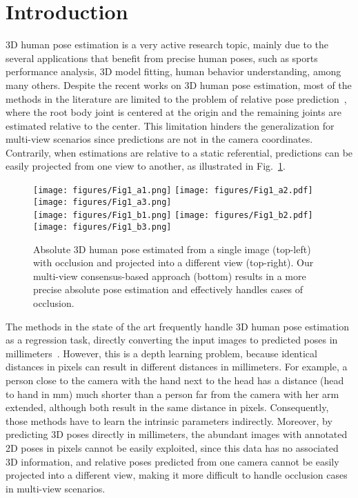 \documentclass[10pt,twocolumn,letterpaper]{article}
\newcommand{\revb}[1]{{#1}}
\begin{document}
\section{Introduction}

3D human pose estimation is a very active research topic, mainly due to the
several applications that benefit from precise human poses, such as
sports performance analysis, 3D model fitting, human behavior
understanding, among many others.
Despite the recent works on 3D human pose estimation, most of the
methods in the literature are limited to the problem of relative pose
prediction~\cite{Chen_2017_CVPR, Tome_2017_CVPR, Zhou_2016_CVPR, belagiannis20143d, amin2013multi}, where the root body joint is centered at the origin and the
remaining joints are estimated relative to the center.
This limitation hinders the generalization for multi-view scenarios
since predictions are not in the camera coordinates.
Contrarily, when estimations are relative to \revb{a static referential, predictions}
can be easily projected from one view to another,
as illustrated in Fig.~\ref{fig:intro}.

\begin{figure}[!h]
  \centering
  \texttt{[image: figures/Fig1\_a1.png]}
  \texttt{[image: figures/Fig1\_a2.pdf]}
  \texttt{[image: figures/Fig1\_a3.png]}\\
  \texttt{[image: figures/Fig1\_b1.png]}
  \texttt{[image: figures/Fig1\_b2.pdf]}
  \texttt{[image: figures/Fig1\_b3.png]}\caption{Absolute 3D human pose estimated from a single image (top-left)
  with occlusion and projected into a different view (top-right). Our multi-view
  consensus-based approach (bottom) results in a more precise absolute pose
  estimation and effectively handles cases of occlusion.}
  \label{fig:intro}
\end{figure}

The methods in the state of the art frequently handle 3D human pose estimation
as a regression task, directly converting the input images to predicted poses in
millimeters~\cite{Sun_2018_ECCV, Li_2015_ICCV}.  However, this is a depth
learning problem, because identical distances in pixels can result in different
distances in millimeters. For example, a person close to the camera with the
hand next to the head has a distance (head to hand in mm) much shorter than a
person far from the camera with her arm extended, although both result in the
same distance in pixels.  Consequently, those methods have to learn the
intrinsic parameters indirectly.
Moreover, by predicting 3D poses directly in millimeters, the abundant
images with annotated 2D poses in pixels cannot be easily exploited, since
this data has no associated 3D information, and relative poses
predicted from one camera cannot be easily projected into a different view,
making it more difficult to handle occlusion cases in multi-view scenarios.
\end{document}
